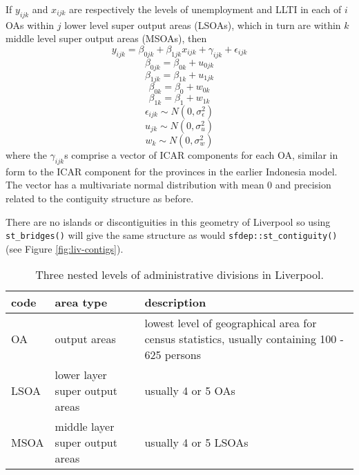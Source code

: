 If \(y_{ijk}\) and \(x_{ijk}\) are respectively the levels of unemployment and LLTI in each of \(i\) OAs within \(j\) lower level super output areas (LSOAs), which in turn are within \(k\) middle level super output areas (MSOAs), then
\begin{equation}
y_{ijk} = \beta_{0jk} + \beta_{1jk}x_{ijk} + \gamma_{ijk} + \epsilon_{ijk}
\label{eq:eq9}
\end{equation}
\begin{equation}
\beta_{0jk} = \beta_{0k} + u_{0jk}
\label{eq:eq10}
\end{equation}
\begin{equation}
\beta_{1jk} = \beta_{1k} + u_{1jk}
\label{eq:eq11}
\end{equation}
\begin{equation}
\beta_{0k} = \beta_0 + w_{0k}
\label{eq:eq12}
\end{equation}
\begin{equation}
\beta_{1k} = \beta_1 + w_{1k}
\label{eq:eq13}
\end{equation}
\begin{equation}
\epsilon_{ijk} \sim N(0,\sigma_{\epsilon}^2)
\label{eq:eq14}
\end{equation}
\begin{equation}
u_{jk} \sim N(0,\sigma_{u}^2)
\label{eq:eq15}
\end{equation}
\begin{equation}
 w_{k} \sim N(0,\sigma_{w}^2)
\label{eq:eq16}
\end{equation}
where the \(\gamma_{ijk}\)s comprise a vector of ICAR components for each OA, similar in form to the ICAR component for the provinces in the earlier Indonesia model. The vector has a multivariate normal distribution with mean 0 and precision related to the contiguity structure as before.

There are no islands or discontiguities in this geometry of Liverpool so
using \texttt{st\_bridges()} will give the same structure as would
\texttt{sfdep::st\_contiguity()} (see Figure \ref{fig:liv-contigs}).

\begin{table}

\caption{\label{tab:livadmin-latex}Three nested levels of administrative divisions in Liverpool.}
\centering
\fontsize{8}{10}\selectfont
\begin{tabular}[t]{l|l|>{\raggedright\arraybackslash}p{7cm}}
\hline
\textbf{code} & \textbf{area type} & \textbf{description}\\
\hline
OA & output areas & lowest level of geographical area for census statistics, usually containing 100 - 625 persons\\
\hline
LSOA & lower layer super output areas & usually 4 or 5 OAs\\
\hline
MSOA & middle layer super output areas & usually 4 or 5 LSOAs\\
\hline
\end{tabular}
\end{table}


